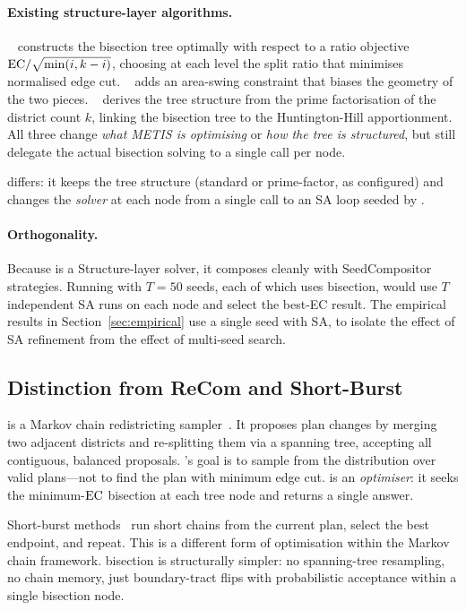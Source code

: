 \paragraph{Existing structure-layer algorithms.}
\geosec{}~\citep{b8paper} constructs the bisection tree optimally with
respect to a ratio objective $\mathrm{EC}/\sqrt{\min(i,k-i)}$, choosing at each level
the split ratio that minimises normalised edge cut.
\areasec{}~\citep{b9paper} adds an area-swing constraint that biases the
geometry of the two pieces.
\ar{}~\citep{b11paper} derives the tree structure from the prime factorisation
of the district count $k$, linking the bisection tree to the Huntington-Hill
apportionment.
All three change \emph{what METIS is optimising} or \emph{how the tree is
structured}, but still delegate the actual bisection solving to a single
\metis{} call per node.

\sa{} differs: it keeps the tree structure (standard or prime-factor, as
configured) and changes the \emph{solver} at each node from a single
\metis{} call to an SA loop seeded by \metis{}.

\paragraph{Orthogonality.}
Because \sa{} is a Structure-layer solver, it composes cleanly with
SeedCompositor strategies.
Running \be{} with $T=50$ seeds, each of which uses \sa{} bisection, would
use $T$ independent SA runs on each node and select the best-EC result.
The empirical results in Section~\ref{sec:empirical} use a single seed with
SA, to isolate the effect of SA refinement from the effect of multi-seed
search.

\subsection{Distinction from ReCom and Short-Burst}

\recom{} is a Markov chain redistricting sampler~\citep{deford2021}.
It proposes plan changes by merging two adjacent districts and re-splitting
them via a spanning tree, accepting all contiguous, balanced proposals.
\recom{}'s goal is to sample from the distribution over valid plans---not
to find the plan with minimum edge cut.
\sa{} is an \emph{optimiser}: it seeks the minimum-$\mathrm{EC}$ bisection at each
tree node and returns a single answer.

Short-burst methods~\citep{cannon2022} run short \recom{} chains from the
current plan, select the best endpoint, and repeat.
This is a different form of optimisation within the Markov chain framework.
\sa{} bisection is structurally simpler: no spanning-tree resampling, no
chain memory, just boundary-tract flips with probabilistic acceptance within
a single bisection node.

